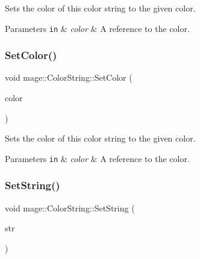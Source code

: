 Sets the color of this color string to the given color.


\begin{DoxyParams}[1]{Parameters}
\mbox{\tt in}  & {\em color} & A reference to the color. \\
\hline
\end{DoxyParams}
\hypertarget{structmage_1_1_color_string_a298a253ed03e92f4c083b65af9c7dc06}{}\label{structmage_1_1_color_string_a298a253ed03e92f4c083b65af9c7dc06} 
\subsubsection{\texorpdfstring{Set\+Color()}{SetColor()}\hspace{0.1cm}{\footnotesize\ttfamily [3/3]}}
{\footnotesize\ttfamily void mage\+::\+Color\+String\+::\+Set\+Color (\begin{DoxyParamCaption}\item[{const X\+M\+V\+E\+C\+T\+OR \&}]{color }\end{DoxyParamCaption})\hspace{0.3cm}{\ttfamily [noexcept]}}

Sets the color of this color string to the given color.


\begin{DoxyParams}[1]{Parameters}
\mbox{\tt in}  & {\em color} & A reference to the color. \\
\hline
\end{DoxyParams}
\hypertarget{structmage_1_1_color_string_aa5ec8bb8e44683ed8a88534f04639930}{}\label{structmage_1_1_color_string_aa5ec8bb8e44683ed8a88534f04639930} 
\subsubsection{\texorpdfstring{Set\+String()}{SetString()}\hspace{0.1cm}{\footnotesize\ttfamily [1/3]}}
{\footnotesize\ttfamily void mage\+::\+Color\+String\+::\+Set\+String (\begin{DoxyParamCaption}\item[{const wstring \&}]{str }\end{DoxyParamCaption})}


